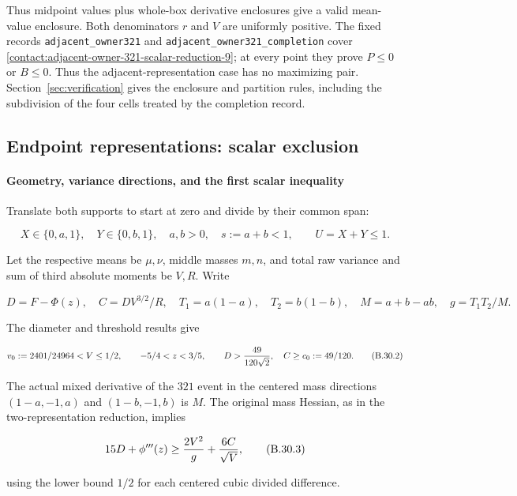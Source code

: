 Thus midpoint values plus whole-box derivative enclosures give a valid
mean-value enclosure. Both denominators $r$ and $V$ are uniformly positive.
The fixed records \texttt{adjacent\_owner321} and
\texttt{adjacent\_owner321\_completion} cover
\eqref{contact:adjacent-owner-321-scalar-reduction-9}; at every point
they prove $P\le0$ or $B\le0$. Thus the adjacent-representation
case has no maximizing pair. Section~\ref{sec:verification} gives
the enclosure and partition rules, including the subdivision of the
four cells treated by the completion record.

\subsection{Endpoint representations: scalar exclusion}\label{contact:endpoint-owner-321-scalar-reduction}


\paragraph{Geometry, variance directions, and the first scalar inequality}

Translate both supports to start at zero and divide by their common span:

\[
 X\in\{0,a,1\},\quad Y\in\{0,b,1\},\quad
 a,b>0,\quad s:=a+b<1,
 \qquad U=X+Y\le1.
\tag{B.30.1}\label{contact:endpoint-owner-321-scalar-reduction-1}
\]

Let the respective means be $\mu,\nu$, middle masses $m,n$, and total raw
variance and sum of third absolute moments be $V,R$. Write

\[
 D=F-\Phi(z),\quad C=DV^{3/2}/R,\quad
 T_1=a(1-a),\quad T_2=b(1-b),\quad
 M=a+b-ab,\quad g=T_1T_2/M.
\]

The diameter and threshold results give

\[
 v_0:=2401/24964<V\le1/2,\qquad -5/4<z<3/5,
 \qquad D>{49\over120\sqrt2},\quad C\ge c_0:=49/120.
\tag{B.30.2}\label{contact:endpoint-owner-321-scalar-reduction-2}
\]

The actual mixed derivative of the $321$ event in the centered mass
directions $(1-a,-1,a)$ and $(1-b,-1,b)$ is $M$. The original mass Hessian,
as in the two-representation reduction, implies

\[
 15D+\phi'''(z)\ge {2V^2\over g}+{6C\over\sqrt V},
\tag{B.30.3}\label{contact:endpoint-owner-321-scalar-reduction-3}
\]

using the lower bound $1/2$ for each centered cubic divided difference.

